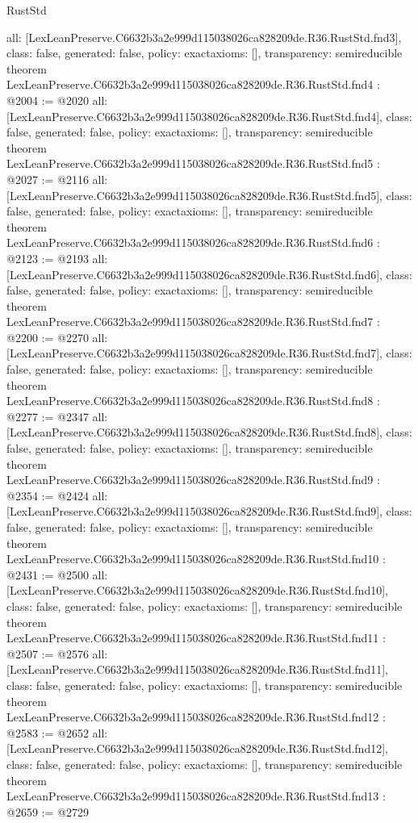 \begin{lexlean}{RustStd}
\begin{coremodule}
{  all: [LexLeanPreserve.C6632b3a2e999d115038026ca828209de.R36.RustStd.fnd3],
  class: false,
  generated: false,
  policy: exact{axioms: []},
  transparency: semireducible
}
theorem LexLeanPreserve.C6632b3a2e999d115038026ca828209de.R36.RustStd.fnd4 : @2004 := @2020 {
  all: [LexLeanPreserve.C6632b3a2e999d115038026ca828209de.R36.RustStd.fnd4],
  class: false,
  generated: false,
  policy: exact{axioms: []},
  transparency: semireducible
}
theorem LexLeanPreserve.C6632b3a2e999d115038026ca828209de.R36.RustStd.fnd5 : @2027 := @2116 {
  all: [LexLeanPreserve.C6632b3a2e999d115038026ca828209de.R36.RustStd.fnd5],
  class: false,
  generated: false,
  policy: exact{axioms: []},
  transparency: semireducible
}
theorem LexLeanPreserve.C6632b3a2e999d115038026ca828209de.R36.RustStd.fnd6 : @2123 := @2193 {
  all: [LexLeanPreserve.C6632b3a2e999d115038026ca828209de.R36.RustStd.fnd6],
  class: false,
  generated: false,
  policy: exact{axioms: []},
  transparency: semireducible
}
theorem LexLeanPreserve.C6632b3a2e999d115038026ca828209de.R36.RustStd.fnd7 : @2200 := @2270 {
  all: [LexLeanPreserve.C6632b3a2e999d115038026ca828209de.R36.RustStd.fnd7],
  class: false,
  generated: false,
  policy: exact{axioms: []},
  transparency: semireducible
}
theorem LexLeanPreserve.C6632b3a2e999d115038026ca828209de.R36.RustStd.fnd8 : @2277 := @2347 {
  all: [LexLeanPreserve.C6632b3a2e999d115038026ca828209de.R36.RustStd.fnd8],
  class: false,
  generated: false,
  policy: exact{axioms: []},
  transparency: semireducible
}
theorem LexLeanPreserve.C6632b3a2e999d115038026ca828209de.R36.RustStd.fnd9 : @2354 := @2424 {
  all: [LexLeanPreserve.C6632b3a2e999d115038026ca828209de.R36.RustStd.fnd9],
  class: false,
  generated: false,
  policy: exact{axioms: []},
  transparency: semireducible
}
theorem LexLeanPreserve.C6632b3a2e999d115038026ca828209de.R36.RustStd.fnd10 : @2431 := @2500 {
  all: [LexLeanPreserve.C6632b3a2e999d115038026ca828209de.R36.RustStd.fnd10],
  class: false,
  generated: false,
  policy: exact{axioms: []},
  transparency: semireducible
}
theorem LexLeanPreserve.C6632b3a2e999d115038026ca828209de.R36.RustStd.fnd11 : @2507 := @2576 {
  all: [LexLeanPreserve.C6632b3a2e999d115038026ca828209de.R36.RustStd.fnd11],
  class: false,
  generated: false,
  policy: exact{axioms: []},
  transparency: semireducible
}
theorem LexLeanPreserve.C6632b3a2e999d115038026ca828209de.R36.RustStd.fnd12 : @2583 := @2652 {
  all: [LexLeanPreserve.C6632b3a2e999d115038026ca828209de.R36.RustStd.fnd12],
  class: false,
  generated: false,
  policy: exact{axioms: []},
  transparency: semireducible
}
theorem LexLeanPreserve.C6632b3a2e999d115038026ca828209de.R36.RustStd.fnd13 : @2659 := @2729 {
}
\end{coremodule}
\end{lexlean}
